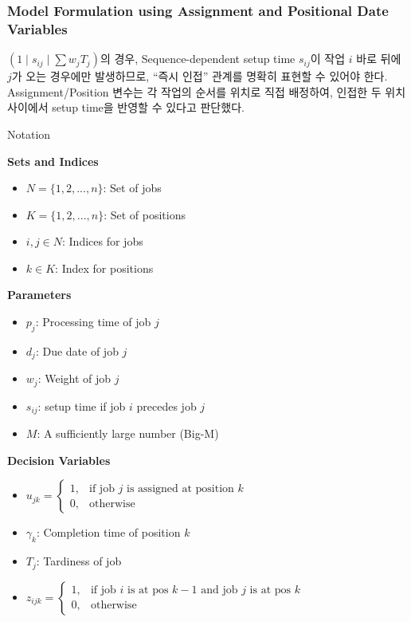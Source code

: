\documentclass[10pt]{article}
\begin{document}
\subsubsection*{Model Formulation using Assignment and Positional Date Variables}
$(1 \mid s_{ij} \mid \sum w_j T_j)$의 경우, Sequence-dependent setup time $s_{ij}$이 작업 $i$ 바로 뒤에 $j$가 오는 경우에만 발생하므로, “즉시 인접” 관계를 명확히 표현할 수 있어야 한다. Assignment/Position 변수는 각 작업의 순서를 위치로 직접 배정하여, 인접한 두 위치 사이에서 setup time을 반영할 수 있다고 판단했다.
\vspace{0.5em}

\begin{stabilitybox}{Notation}
  \begin{minipage}[t]{0.43\linewidth}
      \textbf{Sets and Indices}
      \begin{itemize}
          \item $N = \{1, 2, ..., n\}$: Set of jobs
          \item $K = \{1, 2, ..., n\}$: Set of positions
          \item $i, j \in N$: Indices for jobs
          \item $k \in K$: Index for positions
      \end{itemize}
      \textbf{Parameters}
      \begin{itemize}
          \item $p_j$: Processing time of job $j$
          \item $d_j$: Due date of job $j$
          \item $w_j$: Weight of job $j$
          \item $s_{ij}$: setup time if job $i$ precedes job $j$
          \item $M$: A sufficiently large number (Big-M)
      \end{itemize}
  \end{minipage}
  \hfill
  \begin{minipage}[t]{0.56\linewidth}
      \textbf{Decision Variables}
      \begin{itemize}
        \item $u_{jk} = \begin{cases} 1, & \text{if job } j \text{ is assigned at position } k \\ 0, & \text{otherwise} \end{cases}$
        \item $\gamma_k$: Completion time of position $k$
        \item $T_j$: Tardiness of job
        \item $z_{ijk} = \begin{cases} 1, & \text{if job } i \text{ is at pos } k-1 \text{ and job } j \text{ is at pos } k \\ 0, & \text{otherwise} \end{cases}$
      \end{itemize}
  \end{minipage}
\end{stabilitybox}
\end{document}
